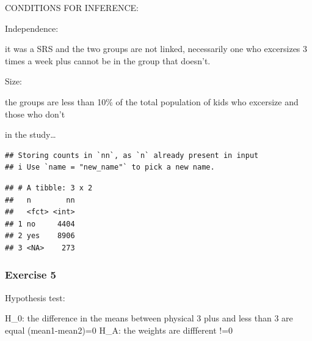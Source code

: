 \documentclass[
]{article}
\newenvironment{Shaded}{\begin{snugshade}}{\end{snugshade}}
\newcommand{\CommentTok}[1]{\textcolor[rgb]{0.56,0.35,0.01}{\textit{#1}}}
\newcommand{\DataTypeTok}[1]{\textcolor[rgb]{0.13,0.29,0.53}{#1}}
\newcommand{\DecValTok}[1]{\textcolor[rgb]{0.00,0.00,0.81}{#1}}
\newcommand{\KeywordTok}[1]{\textcolor[rgb]{0.13,0.29,0.53}{\textbf{#1}}}
\newcommand{\NormalTok}[1]{#1}
\newcommand{\OperatorTok}[1]{\textcolor[rgb]{0.81,0.36,0.00}{\textbf{#1}}}
\newcommand{\StringTok}[1]{\textcolor[rgb]{0.31,0.60,0.02}{#1}}
\begin{document}
CONDITIONS FOR INFERENCE:

Independence:

it was a SRS and the two groups are not linked, necessarily one who
excersizes 3 times a week plus cannot be in the group that doesn't.

Size:

the groups are less than 10\% of the total population of kids who
excersize and those who don't

in the study\ldots{}

\begin{Shaded}
\end{Shaded}

\begin{verbatim}
## Storing counts in `nn`, as `n` already present in input
## i Use `name = "new_name"` to pick a new name.
\end{verbatim}

\begin{verbatim}
## # A tibble: 3 x 2
##   n        nn
##   <fct> <int>
## 1 no     4404
## 2 yes    8906
## 3 <NA>    273
\end{verbatim}

\hypertarget{exercise-5}{%
\subsubsection{Exercise 5}\label{exercise-5}}

Hypothesis test:

H\_0: the difference in the means between physical 3 plus and less than
3 are equal (mean1-mean2)=0 H\_A: the weights are diffferent !=0

\begin{Shaded}
\end{Shaded}
\end{document}
